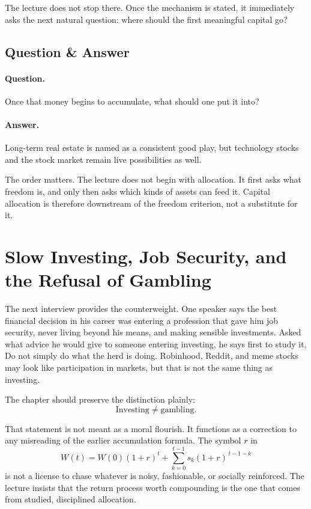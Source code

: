 The lecture does not stop there. Once the mechanism is stated, it immediately asks the next natural question: where should the first meaningful capital go?

\subsection{Question \& Answer}

\paragraph{Question.}
Once that money begins to accumulate, what should one put it into?

\paragraph{Answer.}
Long-term real estate is named as a consistent good play, but technology stocks and the stock market remain live possibilities as well.

The order matters. The lecture does not begin with allocation. It first asks what freedom is, and only then asks which kinds of assets can feed it. Capital allocation is therefore downstream of the freedom criterion, not a substitute for it.

\section{Slow Investing, Job Security, and the Refusal of Gambling}

The next interview provides the counterweight. One speaker says the best financial decision in his career was entering a profession that gave him job security, never living beyond his means, and making sensible investments. Asked what advice he would give to someone entering investing, he says first to study it. Do not simply do what the herd is doing. Robinhood, Reddit, and meme stocks may look like participation in markets, but that is not the same thing as investing.

The chapter should preserve the distinction plainly:
\begin{equation}
\text{Investing} \neq \text{gambling}.
\end{equation}

That statement is not meant as a moral flourish. It functions as a correction to any misreading of the earlier accumulation formula. The symbol $r$ in
\[
W(t)=W(0)(1+r)^t+\sum_{k=0}^{t-1}s_k(1+r)^{\,t-1-k}
\]
is not a license to chase whatever is noisy, fashionable, or socially reinforced. The lecture insists that the return process worth compounding is the one that comes from studied, disciplined allocation.

